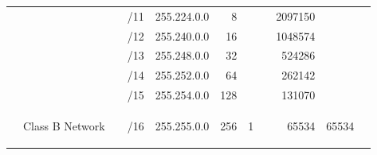 \documentclass[11pt,a4paper]{article}
\begin{document}
\begin{table}[]
\begin{tabular}{ccccl|r|r|r|r|r|r|}
                                                       & \multicolumn{1}{c|}{}                                  & \multicolumn{1}{c|}{}                                  & \multicolumn{1}{c|}{/11} & 255.224.0.0                  & 8                            &                              &                              & 2097150                      &                              &                              \\ \cline{4-11} 
                                                       & \multicolumn{1}{c|}{}                                  & \multicolumn{1}{c|}{}                                  & \multicolumn{1}{c|}{/12} & 255.240.0.0                  & 16                           &                              &                              & 1048574                      &                              &                              \\ \cline{4-11} 
                                                       & \multicolumn{1}{c|}{}                                  & \multicolumn{1}{c|}{}                                  & \multicolumn{1}{c|}{/13} & 255.248.0.0                  & 32                           &                              &                              & 524286                       &                              &                              \\ \cline{4-11} 
                                                       & \multicolumn{1}{c|}{}                                  & \multicolumn{1}{c|}{}                                  & \multicolumn{1}{c|}{/14} & 255.252.0.0                  & 64                           &                              &                              & 262142                       &                              &                              \\ \cline{4-11} 
                                                       & \multicolumn{1}{c|}{}                                  & \multicolumn{1}{c|}{}                                  & \multicolumn{1}{c|}{/15} & 255.254.0.0                  & 128                          &                              &                              & 131070                       &                              &                              \\ \cline{2-2} \cline{4-11} 
\multicolumn{1}{c|}{}                                  & \multicolumn{1}{c|}{\multirow{15}{*}{\begin{sideways}Class B Network\end{sideways}}} & \multicolumn{1}{c|}{}                                  & \multicolumn{1}{c|}{/16} & 255.255.0.0                  & 256                          & 1                            &                              & 65534                        & 65534                        &                              \\ \cline{4-11} 

\end{tabular}
\end{table}
\end{document}
